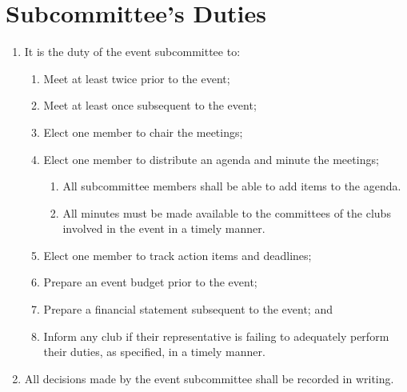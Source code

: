 \documentclass[a4paper]{article}
\newenvironment{enumsection}[1]{\section{#1} \begin{enumerate}[ref=\thesection.\theenumi]}{\end{enumerate}}
\begin{document}
\begin{enumsection}{Subcommittee's Duties}
    \item It is the duty of the event subcommittee to:
    \begin{enumerate}
        \item Meet at least twice prior to the event;
        \item Meet at least once subsequent to the event;
        \item Elect one member to chair the meetings;
        \item Elect one member to distribute an agenda and minute the meetings;
        \begin{enumerate}
            \item All subcommittee members shall be able to add items to the agenda.
            \item All minutes must be made available to the committees of the clubs involved in the event in a timely manner.
        \end{enumerate}
        \item Elect one member to track action items and deadlines;
        \item Prepare an event budget prior to the event;
        \item Prepare a financial statement subsequent to the event; and
        \item Inform any club if their representative is failing to adequately perform their duties, as specified, in a timely manner.
    \end{enumerate}
    \item All decisions made by the event subcommittee shall be recorded in writing.
\end{enumsection}
\end{document}
